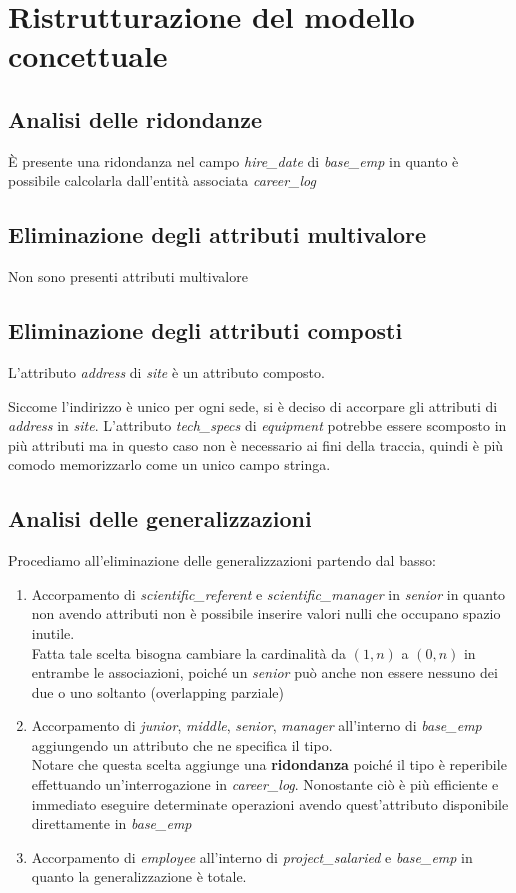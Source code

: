 \section{Ristrutturazione del modello concettuale}
\subsection{Analisi delle ridondanze}
È presente una ridondanza nel campo \textit{hire\_date} di \textit{base\_emp} in quanto è possibile calcolarla dall'entità associata \textit{career\_log}
\subsection{Eliminazione degli attributi multivalore}
Non sono presenti attributi multivalore
\subsection{Eliminazione degli attributi composti}
L'attributo \textit{address} di \textit{site} è un attributo composto.

Siccome l'indirizzo è unico per ogni sede, si è deciso di accorpare gli attributi di \textit{address} in \textit{site}.\meskip
L'attributo \textit{tech\_specs} di \textit{equipment} potrebbe essere scomposto in più attributi ma in questo caso non è necessario ai fini della traccia, quindi è più comodo memorizzarlo come un unico campo stringa.

\subsection{Analisi delle generalizzazioni}
Procediamo all'eliminazione delle generalizzazioni partendo dal basso:
\begin{enumerate}
	\item Accorpamento di \textit{scientific\_referent} e \textit{scientific\_manager} in \textit{senior} in quanto non avendo attributi non è possibile inserire valori nulli che occupano spazio inutile.\\
	      Fatta tale scelta bisogna cambiare la cardinalità da $(1, n)$ a $(0, n)$ in entrambe le associazioni, poiché un \textit{senior} può anche non essere nessuno dei due o uno soltanto (overlapping parziale)
	\item Accorpamento di \textit{junior}, \textit{middle}, \textit{senior}, \textit{manager} all'interno di \textit{base\_emp} aggiungendo un attributo che ne specifica il tipo.\\
	      Notare che questa scelta aggiunge una \textbf{ridondanza} poiché il tipo è reperibile effettuando un'interrogazione in \textit{career\_log}. Nonostante ciò è più efficiente e immediato eseguire determinate operazioni avendo quest'attributo disponibile direttamente in \textit{base\_emp}
	\item Accorpamento di \textit{employee} all'interno di \textit{project\_salaried} e \textit{base\_emp} in quanto la generalizzazione è totale.
\end{enumerate}
